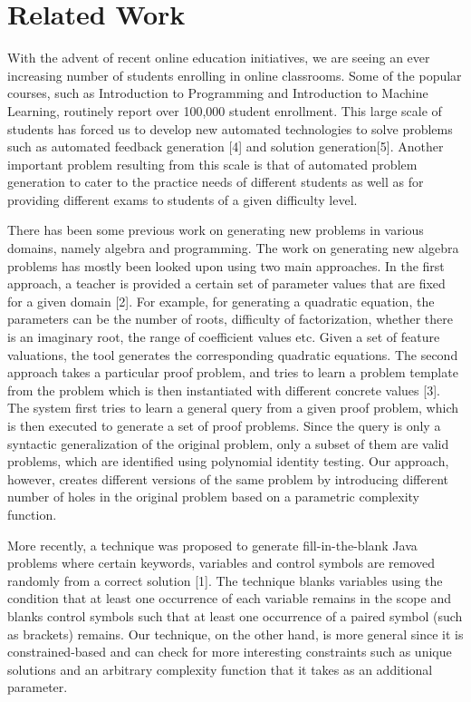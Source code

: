 \section{Related Work}

With the advent of recent online education initiatives, we are seeing an ever increasing number of students enrolling in online classrooms. Some of the popular courses, such as Introduction to Programming and Introduction to Machine Learning, routinely report over 100,000 student enrollment. This large scale of students has forced us to develop new automated technologies to solve problems such as automated feedback generation [4] and solution generation[5]. Another important problem resulting from this scale is that of automated problem generation to cater to the practice needs of different students as well as for providing different exams to students of a given difficulty level.

There has been some previous work on generating new problems in various domains, namely algebra and programming. The work on generating new algebra problems has mostly been looked upon using two main approaches. In the first approach, a teacher is provided a certain set of parameter values that are fixed for a given domain [2]. For example, for generating a quadratic equation, the parameters can be the number of roots, difficulty of factorization, whether there is an imaginary root, the range of coefficient values etc. Given a set of feature valuations, the tool generates the corresponding quadratic equations. The second approach takes a particular proof problem, and tries to learn a problem template from the problem which is then instantiated with different concrete values [3]. The system first tries to learn a general query from a given proof problem, which is then executed to generate a set of proof problems. Since the query is only a syntactic generalization of the original problem, only a subset of them are valid problems, which are identified using polynomial identity testing. Our approach, however, creates different versions of the same problem by introducing different number of holes in the original problem based on a parametric complexity function.

More recently, a technique was proposed to generate fill-in-the-blank Java problems where certain keywords, variables and control symbols are removed randomly from a correct solution [1]. The technique blanks variables using the condition that at least one occurrence of each variable remains in the scope and blanks control symbols such that at least one occurrence of a paired symbol (such as brackets) remains. Our technique, on the other hand, is more general since it is constrained-based and can check for more interesting constraints such as unique solutions and an arbitrary complexity function that it takes as an additional parameter.

